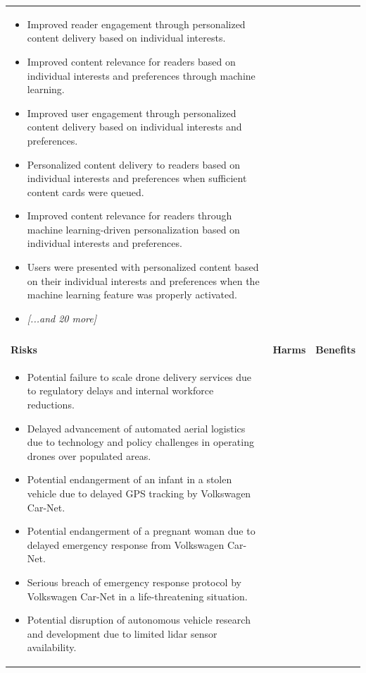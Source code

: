 \begin{longtable}{p{5.2cm}|p{5.2cm}|p{5.2cm}}
\begin{itemize}[leftmargin=*, nosep, before=\vspace{-0.5\baselineskip}, after=\vspace{-0.5\baselineskip}]
\footnotesize
\item Improved reader engagement through personalized content delivery based on individual interests.
\item Improved content relevance for readers based on individual interests and preferences through machine learning.
\item Improved user engagement through personalized content delivery based on individual interests and preferences.
\item Personalized content delivery to readers based on individual interests and preferences when sufficient content cards were queued.
\item Improved content relevance for readers through machine learning-driven personalization based on individual interests and preferences.
\item Users were presented with personalized content based on their individual interests and preferences when the machine learning feature was properly activated.
\item \textit{[...and 20 more]}
\end{itemize} \\
\pagebreak
\multicolumn{3}{l}{\textbf{\large Transport and Logistics} \textit{(N=53 articles)}} \\
\midrule
\textbf{Risks} & \textbf{Harms} & \textbf{Benefits} \\
\midrule
\begin{itemize}[leftmargin=*, nosep, before=\vspace{-0.5\baselineskip}, after=\vspace{-0.5\baselineskip}] 
\footnotesize
\item Potential failure to scale drone delivery services due to regulatory delays and internal workforce reductions.
\item Delayed advancement of automated aerial logistics due to technology and policy challenges in operating drones over populated areas.
\item Potential endangerment of an infant in a stolen vehicle due to delayed GPS tracking by Volkswagen Car-Net.
\item Potential endangerment of a pregnant woman due to delayed emergency response from Volkswagen Car-Net.
\item Serious breach of emergency response protocol by Volkswagen Car-Net in a life-threatening situation.
\item Potential disruption of autonomous vehicle research and development due to limited lidar sensor availability.

\end{itemize}
\end{longtable}
